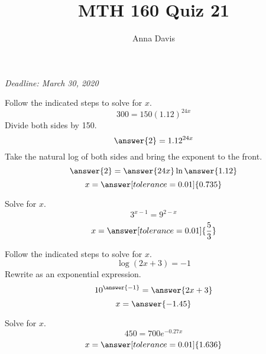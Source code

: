 \documentclass{ximera}
\author{Anna Davis} \title{MTH 160 Quiz 21}
\begin{document}
\begin{abstract}

\end{abstract}
\maketitle
 \textit{Deadline: March 30, 2020}
\begin{problem}\label{prob:quiz21prob1}
Follow the indicated steps to solve for $x$.
$$300=150(1.12)^{24x}$$
Divide both sides by 150.
$$\answer{2}=1.12^{24x}$$
Take the natural log of both sides and bring the exponent to the front.
$$\answer{2}=\answer{24x}\ln\answer{1.12}$$
$$x=\answer[tolerance=0.01]{0.735}$$
\end{problem}

\begin{problem}\label{prob:quiz21prob2}
Solve for $x$.
$$3^{x-1}=9^{2-x}$$
$$x=\answer[tolerance=0.01]{\frac{5}{3}}$$
\end{problem}

\begin{problem}\label{prob:quiz21prob3}
Follow the indicated steps to solve for $x$.
$$\log (2x+3)=-1$$
Rewrite as an exponential expression.
$$10^{\answer{-1}}=\answer{2x+3}$$
$$x=\answer{-1.45}$$
\end{problem}

\begin{problem}\label{prob:quiz21prob4}
Solve for $x$.
$$450=700e^{-0.27x}$$
$$x=\answer[tolerance=0.01]{1.636}$$
\end{problem}
\end{document}
